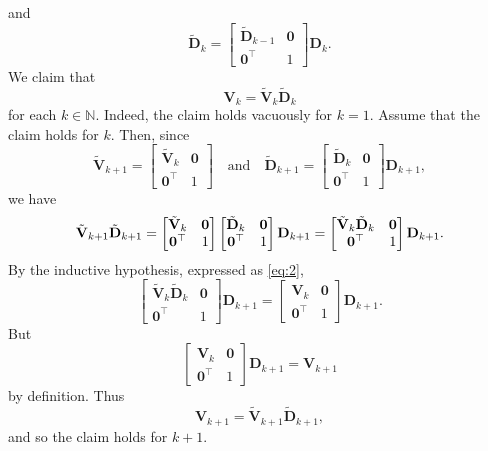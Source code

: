 \documentclass[11pt,a4paper]{article}
\newcommand{\0}{\M{0}}
\newcommand{\M}[1]{\mathbf{#1}}
\newcommand{\Mt}[1]{\tilde{\M{#1}}}
\newcommand{\N}{\mathbb{N}}
\newcommand{\T}{\top}
\begin{document}
and
\begin{displaymath}
  \Mt{D}_k
  =
  \begin{bmatrix}
    \Mt{D}_{k-1} & \0
    \\
    \0^\T & 1
  \end{bmatrix}
  \M{D}_k.
\end{displaymath}
We claim that
\begin{equation}
  \label{eq:2}
  \M{V}_k = \Mt{V}_k \Mt{D}_k
\end{equation}
for each $k \in \N$.  Indeed, the claim holds vacuously for $k = 1$. Assume that the claim holds for $k$. Then, since
\begin{displaymath}
   \Mt{V}_{k+1}
  =
  \begin{bmatrix}
    \Mt{V}_k & \0
    \\
    \0^\T & 1
  \end{bmatrix}
  \quad
  \text{and}
  \quad
  \Mt{D}_{k+1}
  =
  \begin{bmatrix}
    \Mt{D}_k & \0
    \\
    \0^\T & 1
  \end{bmatrix}
  \M{D}_{k+1},
\end{displaymath}
we have
\begin{displaymath}
  \Mt{V}_{k+1} \Mt{D}_{k+1}
  =
   \begin{bmatrix}
    \Mt{V}_k & \0
    \\
    \0^\T & 1
  \end{bmatrix}
  \begin{bmatrix}
    \Mt{D}_k & \0
    \\
    \0^\T & 1
  \end{bmatrix}
  \M{D}_{k+1}
  \\
  =
  \begin{bmatrix}
     \Mt{V}_k \Mt{D}_k & \0
    \\
    \0^\T & 1
  \end{bmatrix}
  \M{D}_{k+1}.
\end{displaymath}
By the inductive hypothesis, expressed as \eqref{eq:2}, 
\begin{displaymath}
  \begin{bmatrix}
     \Mt{V}_k \Mt{D}_k & \0
    \\
    \0^\T & 1
  \end{bmatrix}
  \M{D}_{k+1}
  =
  \begin{bmatrix}
     \M{V}_k & \0
    \\
    \0^\T & 1
  \end{bmatrix}
  \M{D}_{k+1}.
\end{displaymath}
But
\begin{displaymath}
  \begin{bmatrix}
     \M{V}_k & \0
    \\
    \0^\T & 1
  \end{bmatrix}
  \M{D}_{k+1}
  =
  \M{V}_{k+1}
\end{displaymath}
by definition.  Thus
\begin{displaymath}
  \label{eq:1}
  \M{V}_{k+1} = \Mt{V}_{k+1} \Mt{D}_{k+1},
\end{displaymath}
and so the claim holds for $k+1$.



\end{document}
